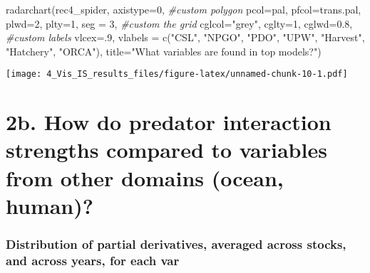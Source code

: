 \documentclass[
]{article}
\newenvironment{Shaded}{\begin{snugshade}}{\end{snugshade}}
\newcommand{\AttributeTok}[1]{\textcolor[rgb]{0.77,0.63,0.00}{#1}}
\newcommand{\CommentTok}[1]{\textcolor[rgb]{0.56,0.35,0.01}{\textit{#1}}}
\newcommand{\DecValTok}[1]{\textcolor[rgb]{0.00,0.00,0.81}{#1}}
\newcommand{\FloatTok}[1]{\textcolor[rgb]{0.00,0.00,0.81}{#1}}
\newcommand{\FunctionTok}[1]{\textcolor[rgb]{0.00,0.00,0.00}{#1}}
\newcommand{\NormalTok}[1]{#1}
\newcommand{\StringTok}[1]{\textcolor[rgb]{0.31,0.60,0.02}{#1}}
\begin{document}
\begin{Shaded}
\begin{Highlighting}[]
\FunctionTok{radarchart}\NormalTok{(rec4\_spider, }\AttributeTok{axistype=}\DecValTok{0}\NormalTok{,}
           \CommentTok{\#custom polygon}
           \AttributeTok{pcol=}\NormalTok{pal, }\AttributeTok{pfcol=}\NormalTok{trans.pal,  }\AttributeTok{plwd=}\DecValTok{2}\NormalTok{, }\AttributeTok{plty=}\DecValTok{1}\NormalTok{, }\AttributeTok{seg =} \DecValTok{3}\NormalTok{,}
           \CommentTok{\#custom the grid}
           \AttributeTok{cglcol=}\StringTok{"grey"}\NormalTok{, }\AttributeTok{cglty=}\DecValTok{1}\NormalTok{, }\AttributeTok{cglwd=}\FloatTok{0.8}\NormalTok{,}
           \CommentTok{\#custom labels}
           \AttributeTok{vlcex=}\NormalTok{.}\DecValTok{9}\NormalTok{, }\AttributeTok{vlabels =} \FunctionTok{c}\NormalTok{(}\StringTok{"CSL"}\NormalTok{, }\StringTok{"NPGO"}\NormalTok{, }\StringTok{"PDO"}\NormalTok{, }\StringTok{"UPW"}\NormalTok{,  }\StringTok{"Harvest"}\NormalTok{,}
                                 \StringTok{"Hatchery"}\NormalTok{, }\StringTok{"ORCA"}\NormalTok{), }
           \AttributeTok{title=}\StringTok{"What variables are found in top models?"}\NormalTok{)}
\end{Highlighting}
\end{Shaded}

\texttt{[image: 4\_Vis\_IS\_results\_files/figure-latex/unnamed-chunk-10-1.pdf]}

\hypertarget{b.-how-do-predator-interaction-strengths-compared-to-variables-from-other-domains-ocean-human-1}{%
\section{2b. How do predator interaction strengths compared to variables
from other domains (ocean,
human)?}\label{b.-how-do-predator-interaction-strengths-compared-to-variables-from-other-domains-ocean-human-1}}

\hypertarget{distribution-of-partial-derivatives-averaged-across-stocks-and-across-years-for-each-var-1}{%
\subsubsection{Distribution of partial derivatives, averaged across
stocks, and across years, for each
var}\label{distribution-of-partial-derivatives-averaged-across-stocks-and-across-years-for-each-var-1}}
\end{document}
